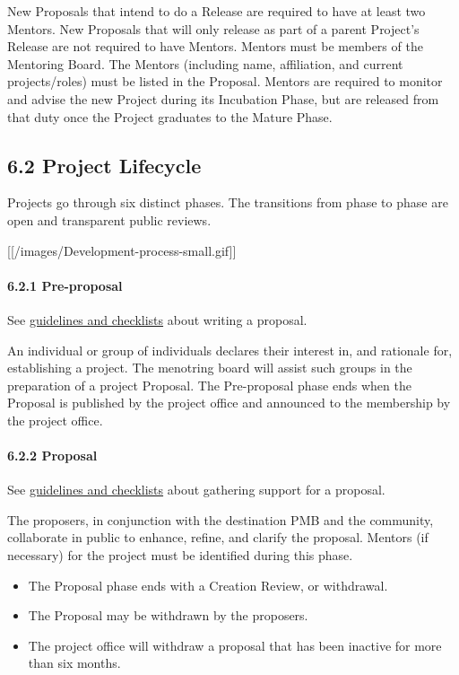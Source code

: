 New Proposals that intend to do a Release are required to have at least
two Mentors. New Proposals that will only release as part of a parent
Project's Release are not required to have Mentors. Mentors must be
members of the Mentoring Board. The Mentors (including name,
affiliation, and current projects/roles) must be listed in the Proposal.
Mentors are required to monitor and advise the new Project during its
Incubation Phase, but are released from that duty once the Project
graduates to the Mature Phase.

\subsection{6.2 Project Lifecycle}\label{project-lifecycle}

Projects go through six distinct phases. The transitions from phase to
phase are open and transparent public reviews.

{[}{[}/images/Development-process-small.gif{]}{]}

\paragraph{6.2.1 Pre-proposal}\label{pre-proposal}

See \href{Project-Proposal-Guidelines}{guidelines and checklists} about
writing a proposal.

An individual or group of individuals declares their interest in, and
rationale for, establishing a project. The menotring board will assist
such groups in the preparation of a project Proposal. The Pre-proposal
phase ends when the Proposal is published by the project office and
announced to the membership by the project office.

\paragraph{6.2.2 Proposal}\label{proposal}

See \href{Project-Proposal-Guidelines}{guidelines and checklists} about
gathering support for a proposal.

The proposers, in conjunction with the destination PMB and the
community, collaborate in public to enhance, refine, and clarify the
proposal. Mentors (if necessary) for the project must be identified
during this phase.

\begin{itemize}

\item
  The Proposal phase ends with a Creation Review, or withdrawal.
\item
  The Proposal may be withdrawn by the proposers.
\item
  The project office will withdraw a proposal that has been inactive for
  more than six months.
\end{itemize}

